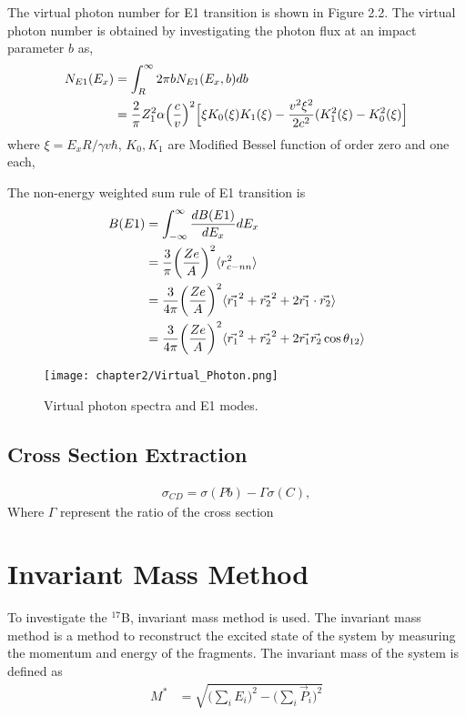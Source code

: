 The virtual photon number for E1 transition is shown in Figure 2.2. The virtual photon number is obtained by investigating the photon flux at an impact parameter $b$ as,
\begin{align}
    N_{E1}(E_x) &= \int_{R}^{\infty} 2\pi b N_{E1}(E_x, b) db \notag \\
                &=\frac{2}{\pi}Z^{2}_{1}\alpha\Big(\frac{c}{v}\Big)^{2}\Big[\xi K_{0}(\xi)K_{1}(\xi)-\frac{v^{2}\xi^{2}}{2c^{2}}(K^{2}_{1}(\xi)-K^{2}_{0}(\xi)\Big]
\end{align}
where $\xi = E_x R / \gamma v \hbar$, $K_0, K_1$ are Modified Bessel function of order zero and one each,


The non-energy weighted sum rule of E1 transition is
\begin{align}
    B(E1) &= \int_{-\infty}^{\infty} \frac{dB(E1)}{dE_x}dE_x \notag \\
        &= \frac{3}{\pi} \bigg(\frac{Z e}{A}\bigg)^2 \langle r^2_{c-nn} \rangle \notag \\
        &= \frac{3}{4 \pi} \bigg(\frac{Z e}{A}\bigg)^2 \langle \vec{r_1}^2 + \vec{r_2}^2 + 2 \vec{r_1} \cdot \vec{r_2} \rangle \notag \\
        &= \frac{3}{4 \pi} \bigg(\frac{Z e}{A}\bigg)^2 \langle \vec{r_1}^2 + \vec{r_2}^2 + 2\vec{r_1} \vec{r_2} \cos \theta_{12} \rangle
\end{align}


\begin{figure}[t]
    \centering
    \texttt{[image: chapter2/Virtual\_Photon.png]}
    \caption[Virtual Photon Spectra and E1 Modes]{Virtual photon spectra and E1 modes.}
\end{figure}

\subsection{Cross Section Extraction}

\begin{align}
    \sigma_{CD} = \sigma(Pb) - \Gamma \sigma(C),
\end{align}
Where $\Gamma$ represent the ratio of the cross section 


\section{Invariant Mass Method}
To investigate the ${}^{17}$B, invariant mass method is used. The invariant mass method is a method to reconstruct the excited state of the system by measuring the momentum and energy of the fragments. The invariant mass of the system is defined as
\begin{align}
    M^* &= \sqrt{\bigg(\sum_{i} E_i\bigg)^2 - \bigg(\sum_{i}\vec{P}_i \bigg)^2} 
\end{align}

